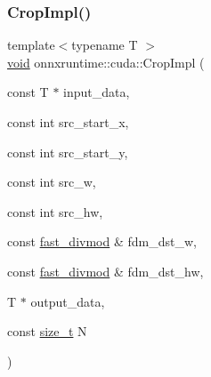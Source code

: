 \mbox{\label{namespaceonnxruntime_1_1cuda_a3329fe7e028acb06f43ca214ea317902}} 
\subsubsection{\texorpdfstring{Crop\+Impl()}{CropImpl()}}
{\footnotesize\ttfamily template$<$typename T $>$ \\
\mbox{\hyperlink{mlasi_8h_a88f941d423cb2a819b70a1358982b1a6}{void}} onnxruntime\+::cuda\+::\+Crop\+Impl (\begin{DoxyParamCaption}\item[{const T $\ast$}]{input\+\_\+data,  }\item[{const int}]{src\+\_\+start\+\_\+x,  }\item[{const int}]{src\+\_\+start\+\_\+y,  }\item[{const int}]{src\+\_\+w,  }\item[{const int}]{src\+\_\+hw,  }\item[{const \mbox{\hyperlink{classonnxruntime_1_1cuda_1_1fast__divmod}{fast\+\_\+divmod}} \&}]{fdm\+\_\+dst\+\_\+w,  }\item[{const \mbox{\hyperlink{classonnxruntime_1_1cuda_1_1fast__divmod}{fast\+\_\+divmod}} \&}]{fdm\+\_\+dst\+\_\+hw,  }\item[{T $\ast$}]{output\+\_\+data,  }\item[{const \mbox{\hyperlink{mlasi_8h_a503efbc1c6e50825320ad909366b78ab}{size\+\_\+t}}}]{N }\end{DoxyParamCaption})}

\mbox{\label{namespaceonnxruntime_1_1cuda_ad9a43f207dedf5127a48035b151b2727}} 
